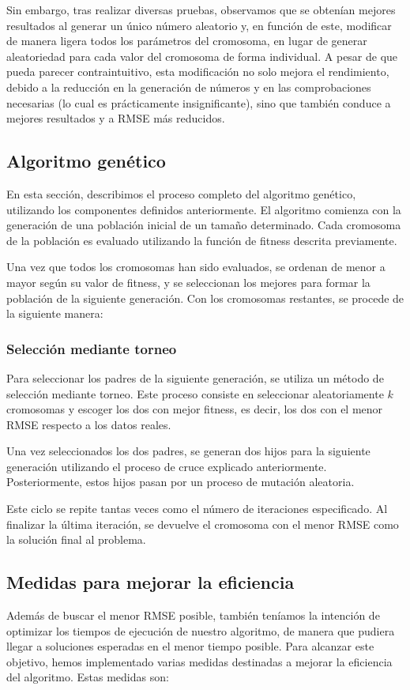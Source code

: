 \documentclass[conference,a4paper]{IEEEtran}
\begin{document}
Sin embargo, tras realizar diversas pruebas, observamos que se obtenían mejores resultados al generar un único número aleatorio y, en función de este, modificar de manera ligera todos los parámetros del cromosoma, en lugar de generar aleatoriedad para cada valor del cromosoma de forma individual. A pesar de que pueda parecer contraintuitivo, esta modificación no solo mejora el rendimiento, debido a la reducción en la generación de números y en las comprobaciones necesarias (lo cual es prácticamente insignificante), sino que también conduce a mejores resultados y a RMSE más reducidos.


\subsection{Algoritmo genético}
En esta sección, describimos el proceso completo del algoritmo genético, utilizando los componentes definidos anteriormente. El algoritmo comienza con la generación de una población inicial de un tamaño determinado. Cada cromosoma de la población es evaluado utilizando la función de fitness descrita previamente.

Una vez que todos los cromosomas han sido evaluados, se ordenan de menor a mayor según su valor de fitness, y se seleccionan los mejores para formar la población de la siguiente generación. Con los cromosomas restantes, se procede de la siguiente manera:

\subsubsection{Selección mediante torneo}
Para seleccionar los padres de la siguiente generación, se utiliza un método de selección mediante torneo. Este proceso consiste en seleccionar aleatoriamente \(k\) cromosomas y escoger los dos con mejor fitness, es decir, los dos con el menor RMSE respecto a los datos reales.

Una vez seleccionados los dos padres, se generan dos hijos para la siguiente generación utilizando el proceso de cruce explicado anteriormente. Posteriormente, estos hijos pasan por un proceso de mutación aleatoria. 

Este ciclo se repite tantas veces como el número de iteraciones especificado. Al finalizar la última iteración, se devuelve el cromosoma con el menor RMSE como la solución final al problema.


\subsection{Medidas para mejorar la eficiencia}
Además de buscar el menor RMSE posible, también teníamos la intención de optimizar los tiempos de ejecución de nuestro algoritmo, de manera que pudiera llegar a soluciones esperadas en el menor tiempo posible. Para alcanzar este objetivo, hemos implementado varias medidas destinadas a mejorar la eficiencia del algoritmo. Estas medidas son:
\end{document}
